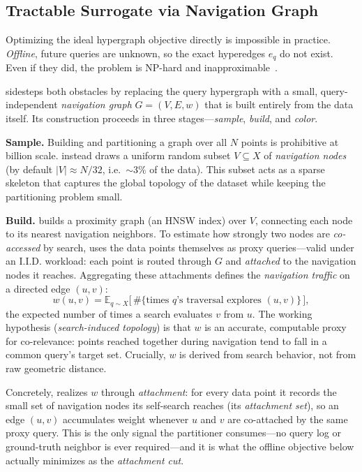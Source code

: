 \subsection{Tractable Surrogate via Navigation Graph}
\label{sec:nav_graph}
Optimizing the ideal hypergraph objective directly is impossible in practice. \emph{Offline}, future queries are unknown, so the exact hyperedges $e_q$ do not exist. Even if they did, the problem is NP-hard and inapproximable~\cite{andreev2006}.

\sysname sidesteps both obstacles by replacing the query hypergraph with a small, query-independent \emph{navigation graph} $G=(V,E,w)$ that is built entirely from the data itself. Its construction proceeds in three stages---\emph{sample}, \emph{build}, and \emph{color}.

\noindent\textbf{Sample.} Building and partitioning a graph over all $N$ points is prohibitive at billion scale. \sysname instead draws a uniform random subset $V\subseteq X$ of \emph{navigation nodes} (by default $|V|\approx N/32$, i.e.\ $\sim\!3\%$ of the data). This subset acts as a sparse skeleton that captures the global topology of the dataset while keeping the partitioning problem small.

\noindent\textbf{Build.} \sysname builds a proximity graph (an HNSW index) over $V$, connecting each node to its nearest navigation neighbors. To estimate how strongly two nodes are \emph{co-accessed} by search, \sysname uses the data points themselves as proxy queries---valid under an I.I.D. workload: each point is routed through $G$ and \emph{attached} to the navigation nodes it reaches. Aggregating these attachments defines the \emph{navigation traffic} on a directed edge $(u,v)$:
\begin{equation}
\label{eq:traffic}
w(u,v)=\mathbb{E}_{q\sim X}\bigl[\,\#\{\text{times $q$'s traversal explores }(u,v)\}\,\bigr],
\end{equation}
the expected number of times a search evaluates $v$ from $u$. The working hypothesis (\emph{search-induced topology}) is that $w$ is an accurate, computable proxy for co-relevance: points reached together during navigation tend to fall in a common query's target set. Crucially, $w$ is derived from search behavior, not from raw geometric distance.

Concretely, \sysname realizes $w$ through \emph{attachment}: for every data point it records the small set of navigation nodes its self-search reaches (its \emph{attachment set}), so an edge $(u,v)$ accumulates weight whenever $u$ and $v$ are co-attached by the same proxy query. This is the only signal the partitioner consumes---no query log or ground-truth neighbor is ever required---and it is what the offline objective below actually minimizes as the \emph{attachment cut}.

